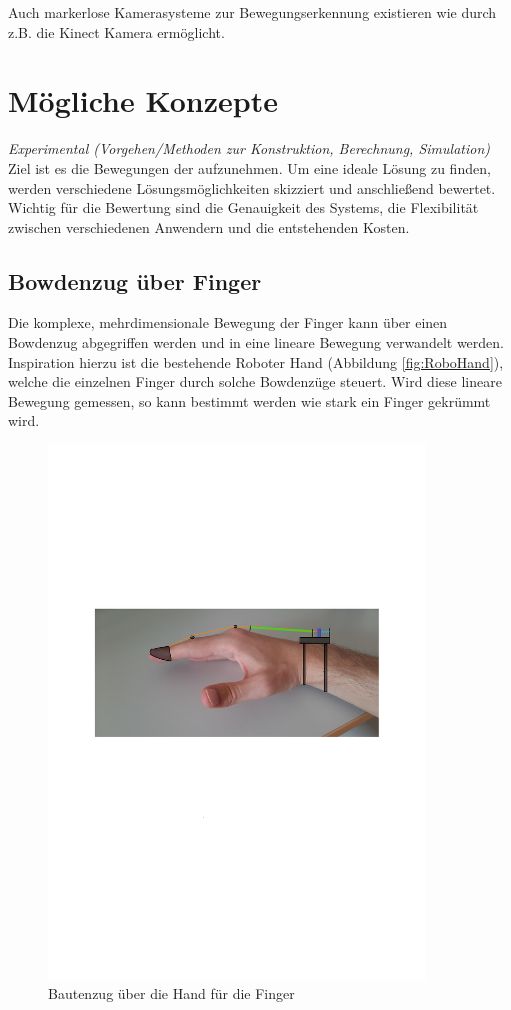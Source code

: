 \documentclass[a4paper,12pt,final]{article} %
\numberwithin{equation}{section} %
\numberwithin{figure}{section} %
\numberwithin{table}{section} %
\begin{document}
Auch markerlose Kamerasysteme zur Bewegungserkennung existieren wie durch z.B. die Kinect Kamera ermöglicht.


\newpage
\section{Mögliche Konzepte}
\emph{Experimental (Vorgehen/Methoden zur Konstruktion, Berechnung, Simulation)}
Ziel ist es die Bewegungen der aufzunehmen.
Um eine ideale Lösung zu finden, werden verschiedene Lösungsmöglichkeiten skizziert und anschließend bewertet.
Wichtig für die Bewertung sind die Genauigkeit des Systems, die Flexibilität zwischen verschiedenen Anwendern und die entstehenden Kosten. 
\subsection{Bowdenzug über Finger}
Die komplexe, mehrdimensionale Bewegung der Finger kann über einen Bowdenzug abgegriffen werden und in eine lineare Bewegung verwandelt werden.
Inspiration hierzu ist die bestehende Roboter Hand (Abbildung \ref{fig:RoboHand}), welche die einzelnen Finger durch solche Bowdenzüge steuert.
Wird diese lineare Bewegung gemessen, so kann bestimmt werden wie stark ein Finger gekrümmt wird. 
\begin{figure}[H]
	\begin{center}
		\includegraphics[width=10cm]{Bilder/HandPhoto1.pdf}
		\caption{Bautenzug über die Hand für die Finger}
		\label{fig:HandFinger}
	\end{center}
\end{figure}
\end{document}
